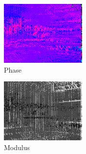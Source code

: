 \documentclass[10pt]{report}
\begin{document}
\begin{figure}[H]
        \begin{subfigure}[b]{0.3\textwidth}
                \centering
                \includegraphics[width=\textwidth]{D0-angle-h.png}
                \caption{Phase}
                \label{fig:p}
        \end{subfigure}
        \begin{subfigure}[b]{0.3\textwidth}
                \centering
                \includegraphics[width=\textwidth]{D0-norm-h.png}
                \caption{Modulus}
                \label{fig:m}
        \end{subfigure}
        \begin{subfigure}[b]{0.3\textwidth}
                \centering

\end{subfigure}
\end{figure}
\end{document}
